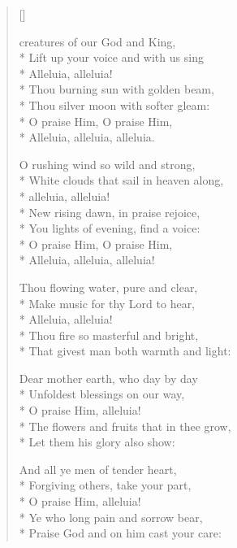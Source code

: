 \newHymn
{}
\begin{verse}[\versewidth]

\begin{patverse}
 creatures of our God and King,\\*
Lift up your voice and with us sing\\*
Alleluia, alleluia!\\*
Thou burning sun with golden beam,\\*
Thou silver moon with softer gleam:\\*
O praise Him, O praise Him,\\*
Alleluia, alleluia, alleluia.
\end{patverse}


\begin{patverse}
O rushing wind so wild and strong,\\*
White clouds that sail in heaven along,\\*
alleluia, alleluia!\\*
New rising dawn, in praise rejoice,\\*
You lights of evening, find a voice:\\*
O praise Him, O praise Him,\\*
Alleluia, alleluia, alleluia!
\end{patverse}

\begin{patverse}
Thou flowing water, pure and clear,\\*
Make music for thy Lord to hear,\\*
Alleluia, alleluia!\\*
Thou fire so masterful and bright,\\*
That givest man both warmth and light:
\end{patverse}

\begin{patverse}
Dear mother earth, who day by day\\*
Unfoldest blessings on our way,\\*
O praise Him, alleluia!\\*
The flowers and fruits that in thee grow,\\*
Let them his glory also show:
\end{patverse}

\begin{patverse}
And all ye men of tender heart,\\*
Forgiving others, take your part,\\*
O praise Him, alleluia!\\*
Ye who long pain and sorrow bear,\\*
Praise God and on him cast your care:
\end{patverse}


\end{verse}
